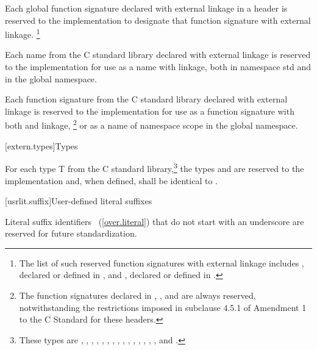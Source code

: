 \pnum
Each
%
global function signature declared with
%
external linkage in a header is reserved to the
implementation to designate that function signature with
%
external linkage.
\footnote{The list of such reserved function
signatures with external linkage includes
%
,
declared or defined in
%
,
and
%
%
,
declared or defined in
%
.}

\pnum
Each name from the C standard library declared with external linkage
%
is reserved to the implementation for use as a name with
%
%
linkage,
both in namespace std and in the global namespace.

\pnum
Each function signature from the C standard library declared with
%
external linkage
is reserved to the implementation for use as
a function signature with both
%
and
%
linkage,
\footnote{
The function
signatures declared in
%
%
%
%
%
%
, 
,
and
are always reserved, notwithstanding the restrictions imposed in subclause
4.5.1 of Amendment 1 to the C Standard for these headers.}
or as a name of namespace scope in the global namespace.

[extern.types]{Types}

\pnum
For each type T from the C standard library,\footnote{These types are
,
,
,
,
,
,
,
,
,
,
,
,
,
,
,
and
.}
the types
and
are reserved to the implementation and, when defined,
shall be identical to
.

[usrlit.suffix]{User-defined literal suffixes}

\pnum
Literal suffix identifiers ~(\ref{over.literal}) that do not start with an underscore are reserved for future standardization.

